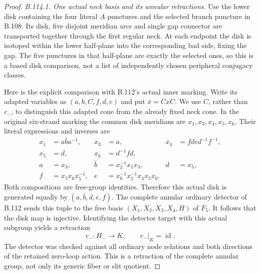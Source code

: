 \begin{proof}
\emph{B.114.1. One actual neck basis and its annular retractions.}
Use the lower disk containing the four literal $A$ punctures and
the selected branch puncture in B.108. Its disk, five disjoint
meridian arcs and single gap connector are transported together
through the first regular neck. At each endpoint the disk is
isotoped within the lower half-plane into the corresponding bad
side, fixing the gap. The five punctures in that half-plane are
exactly the selected ones, so this is a based disk comparison,
not a list of independently chosen peripheral conjugacy classes.

Here is the explicit comparison with B.112's actual inner marking.
Write its adapted variables as $(a,b,C,f,d,e)$ and put
$\bar x=CxC$. We use $C$, rather than $c_-$, to distinguish this
adapted cone from the already fixed neck cone. In the original
six-strand marking the common disk meridians are
$x_1,x_3,x_4,x_5,x_6$. Their literal expressions and inverses are
\begin{equation}\label{eq:B114-neck-basis}
 \begin{aligned}
 x_1&=a\bar b a^{-1},&x_3&=a,&x_4&=fde d^{-1}f^{-1},\\
 x_5&=d,&x_6&=d^{-1}fd,&&\\
 a&=x_3,&\bar b&=x_3^{-1}x_1x_3,&d&=x_5,\\
 f&=x_5x_6x_5^{-1},&
 e&=x_6^{-1}x_5^{-1}x_4x_5x_6.&&
 \end{aligned}
\end{equation}
Both compositions are free-group identities. Therefore this
actual disk is generated equally by $(a,\bar b,d,e,f)$.
The complete annular ordinary detector of B.112 sends this tuple
to the free basis $(X_1,X_2,X_3,X_4,H)$ of $F_5$. It follows that
the disk map is injective. Identifying the detector target with
this actual subgroup yields a retraction
\[
 r_-:H_-\longrightarrow K,\qquad r_-|_K=\operatorname{id}.
\]
The detector was checked against all ordinary node relations and
both directions of the retained zero-loop action. This is a
retraction of the complete annular group, not only its generic
fiber or slit quotient.


\end{proof}
